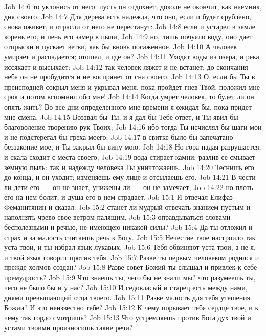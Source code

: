 \vs Job 14:6 то уклонись от него: пусть он отдохнет, доколе не окончит, как наемник, дня своего.
\vs Job 14:7 Для дерева есть надежда, что оно, если и будет срублено, снова оживет, и отрасли от него  не перестанут:
\vs Job 14:8 если и устарел в земле корень его, и пень его замер в пыли,
\vs Job 14:9 но, лишь почуяло воду, оно дает отпрыски и пускает ветви, как бы вновь посаженное.
\vs Job 14:10 А человек умирает и распадается; отошел, и где он?
\vs Job 14:11 Уходят воды из озера, и река иссякает и высыхает:
\vs Job 14:12 так человек ляжет и не встанет; до скончания неба он не пробудится и не воспрянет от сна своего.
\vs Job 14:13 О, если бы Ты в преисподней сокрыл меня и укрывал меня, пока пройдет гнев Твой, положил мне срок и потом вспомнил обо мне!
\vs Job 14:14 Когда умрет человек, то будет ли он опять жить? Во все дни определенного мне времени я ожидал бы, пока придет мне смена.
\vs Job 14:15 Воззвал бы Ты, и я дал бы Тебе ответ, и Ты явил бы благоволение творению рук Твоих;
\vs Job 14:16 ибо тогда Ты исчислял бы шаги мои и не подстерегал бы греха моего;
\vs Job 14:17 в свитке было бы запечатано беззаконие мое, и Ты закрыл бы вину мою.
\vs Job 14:18 Но гора падая разрушается, и скала сходит с места своего;
\vs Job 14:19 вода стирает камни; разлив ее смывает земную пыль: так и надежду человека Ты уничтожаешь.
\vs Job 14:20 Теснишь его до конца, и он уходит; изменяешь ему лице и отсылаешь его.
\vs Job 14:21 В чести ли дети его~--- он не знает, унижены ли~--- он не замечает;
\vs Job 14:22 но плоть его на нем болит, и душа его в нем страдает.
\vs Job 15:1 И отвечал Елифаз Феманитянин и сказал:
\vs Job 15:2 станет ли мудрый отвечать знанием пустым и наполнять чрево свое ветром палящим,
\vs Job 15:3 оправдываться словами бесполезными и речью, не имеющею никакой силы?
\vs Job 15:4 Да ты отложил и страх и за малость считаешь речь к Богу.
\vs Job 15:5 Нечестие твое настроило так уста твои, и ты избрал язык лукавых.
\vs Job 15:6 Тебя обвиняют уста твои, а не я, и твой язык говорит против тебя.
\vs Job 15:7 Разве ты первым человеком родился и прежде холмов создан?
\vs Job 15:8 Разве совет Божий ты слышал и привлек к себе премудрость?
\vs Job 15:9 Что знаешь ты, чего бы не знали мы? что разумеешь ты, чего не было бы и у нас?
\vs Job 15:10 И седовласый и старец есть между нами, днями превышающий отца твоего.
\vs Job 15:11 Разве малость для тебя утешения Божии? И это неизвестно тебе?
\vs Job 15:12 К чему порывает тебя сердце твое, и к чему так гордо смотришь?
\vs Job 15:13 Что устремляешь против Бога дух твой и устами твоими произносишь такие речи?
